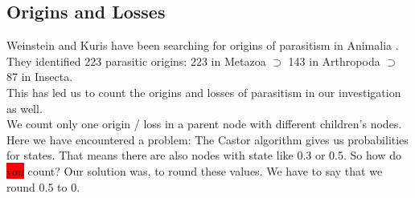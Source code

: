     \subsection{Origins and Losses}

      Weinstein and Kuris have been searching for origins of parasitism in Animalia \cite{Weinstein2016}. 
        They identified 223 parasitic origins: 223 in Metazoa $\supset$ 143 in Arthropoda $\supset$ 87 
        in Insecta. \\
      This has led us to count the origins and losses of parasitism in our investigation as well. \\
      We count only one origin / loss in a parent node with different children's nodes. \\
      Here we have encountered a problem: The Castor algorithm gives us probabilities for states. That 
        means there are also nodes with state like 0.3 or 0.5. So how do \colorbox{red}{you} count? Our solution was, 
        to round these values. We have to say that we round 0.5 to 0.

